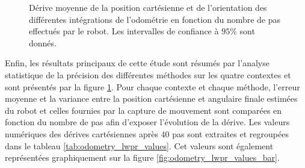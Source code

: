 \begin{figure}[htbp]
\begin{subfigure}{0.37\paperwidth}
    \end{subfigure}
    \caption{\label{fig:odometry_lwpr_compare} 
        Dérive moyenne de la position cartésienne et de l'orientation des différentes intégrations 
        de l'odométrie en fonction du nombre de pas effectués par le robot.
        Les intervalles de confiance à $95$\% sont donnés.
    }
\end{figure}

Enfin, les résultats principaux de cette étude sont résumés par l'analyse statistique de 
la précision des différentes méthodes sur les quatre contextes et sont présentés par 
la figure \ref{fig:odometry_lwpr_compare}.
Pour chaque contexte et chaque méthode, l'erreur moyenne et la variance entre la position 
cartésienne et angulaire finale estimées du robot et celles fournies par la capture de 
mouvement sont comparées en fonction du nombre de pas afin d'exposer l'évolution de la dérive.
Les valeurs numériques des dérives cartésiennes après $40$ pas sont extraites et regroupées dans 
le tableau \ref{tab:odometry_lwpr_values}.
Cet valeurs sont également représentées graphiquement sur la figure \ref{fig:odometry_lwpr_values_bar}.


